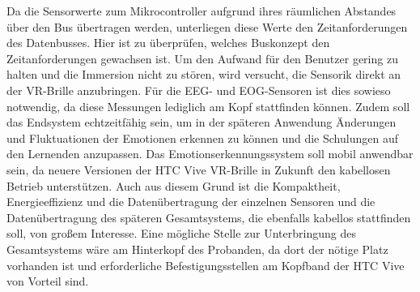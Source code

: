 Da die Sensorwerte zum Mikrocontroller aufgrund ihres räumlichen Abstandes über den
Bus übertragen werden, unterliegen diese Werte den Zeitanforderungen des Datenbusses.
Hier ist zu überprüfen, welches Buskonzept den Zeitanforderungen gewachsen ist.
Um den Aufwand für den Benutzer gering zu halten und die Immersion nicht zu stören,
wird versucht, die Sensorik direkt an der VR-Brille anzubringen. Für die EEG- und
EOG-Sensoren ist dies sowieso notwendig, da diese Messungen lediglich am Kopf stattfinden
können. Zudem soll das Endsystem echtzeitfähig sein, um in der späteren Anwendung
Änderungen und Fluktuationen der Emotionen erkennen zu können und die Schulungen auf
den Lernenden anzupassen. Das Emotionserkennungssystem soll mobil anwendbar sein, da
neuere Versionen der HTC Vive VR-Brille in Zukunft den kabellosen Betrieb unterstützen.
Auch aus diesem Grund ist die Kompaktheit, Energieeffizienz und die Datenübertragung der
einzelnen Sensoren und die Datenübertragung des späteren Gesamtsystems, die ebenfalls
kabellos stattfinden soll, von großem Interesse. Eine mögliche Stelle zur Unterbringung des
Gesamtsystems wäre am Hinterkopf des Probanden, da dort der nötige Platz vorhanden ist
und erforderliche Befestigungsstellen am Kopfband der HTC Vive von Vorteil sind.

